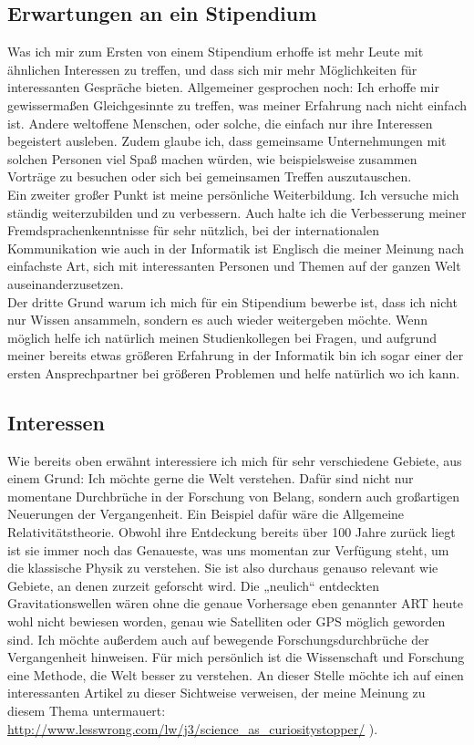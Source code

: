 \documentclass{scrartcl}
\begin{document}
\subsection*{Erwartungen an ein Stipendium}
Was ich mir zum Ersten von einem Stipendium erhoffe ist mehr Leute mit ähnlichen Interessen zu
treffen, und dass sich mir mehr Möglichkeiten für interessanten Gespräche bieten. Allgemeiner
gesprochen noch: Ich erhoffe mir gewissermaßen Gleichgesinnte zu treffen, was meiner Erfahrung
nach nicht einfach ist. Andere weltoffene Menschen, oder solche, die einfach nur ihre Interessen
begeistert ausleben. Zudem glaube ich, dass gemeinsame Unternehmungen mit solchen Personen viel
Spaß machen würden, wie beispielsweise zusammen Vorträge zu besuchen oder sich bei gemeinsamen
Treffen auszutauschen. \\ Ein zweiter großer Punkt ist meine persönliche Weiterbildung. Ich versuche
mich ständig weiterzubilden und zu verbessern.
Auch halte ich die Verbesserung meiner Fremdsprachenkenntnisse für sehr nützlich,
bei der internationalen Kommunikation wie auch in der Informatik ist Englisch die meiner Meinung
nach einfachste Art, sich mit interessanten Personen und Themen auf der ganzen Welt auseinanderzusetzen. \\
Der dritte Grund warum ich mich für ein Stipendium bewerbe ist, dass ich nicht nur Wissen
ansammeln, sondern es auch wieder weitergeben möchte. Wenn möglich helfe ich natürlich meinen
Studienkollegen bei Fragen, und aufgrund meiner bereits etwas größeren Erfahrung in der Informatik
bin ich sogar einer der ersten Ansprechpartner bei größeren Problemen und helfe natürlich wo ich kann.

\subsection*{Interessen}
Wie bereits oben erwähnt interessiere ich mich für sehr verschiedene Gebiete, aus einem Grund:
Ich möchte gerne die Welt verstehen. Dafür sind nicht nur momentane Durchbrüche in der Forschung
von Belang, sondern auch großartigen Neuerungen der Vergangenheit. Ein Beispiel dafür wäre die
Allgemeine Relativitätstheorie. Obwohl ihre Entdeckung bereits über 100 Jahre zurück liegt ist
sie immer noch das Genaueste, was uns momentan zur Verfügung steht, um die klassische Physik
zu verstehen. Sie ist also durchaus genauso relevant wie Gebiete, an denen zurzeit geforscht
wird. Die „neulich“ entdeckten Gravitationswellen wären ohne die genaue Vorhersage eben genannter
ART heute wohl nicht bewiesen worden, genau wie Satelliten oder GPS möglich geworden sind.
Ich möchte außerdem auch auf bewegende Forschungsdurchbrüche der Vergangenheit hinweisen. Für mich
persönlich ist die Wissenschaft und Forschung eine Methode, die Welt besser zu verstehen.
An dieser Stelle möchte ich auf einen interessanten Artikel zu dieser Sichtweise
verweisen, der meine Meinung zu diesem Thema untermauert:
\url{http://www.lesswrong.com/lw/j3/science\_as\_curiositystopper/}
).
\end{document}
